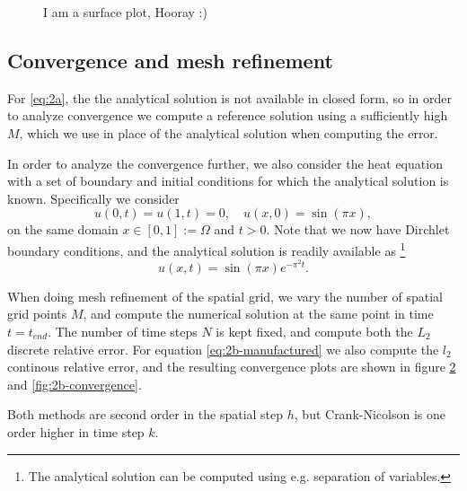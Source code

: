 \begin{figure}[ht]
    \centering
    
    \caption{I am a surface plot, Hooray :)}
    \label{fig:2a-surface}
\end{figure}

\subsection{Convergence and mesh refinement}
For \eqref{eq:2a}, the the analytical solution is not available in closed form, 
so in order to analyze convergence we compute a reference solution using a sufficiently high $M$, 
which we use in place of the analytical solution when computing the error. 

In order to analyze the convergence further, 
we also consider the heat equation with a set of boundary and initial conditions for which the analytical solution is known. 
Specifically we consider 
\begin{equation}
    u(0,t) = u(1,t) = 0, \quad u(x,0) = \sin(\pi x), 
    \label{eq:2b-manufactured}
\end{equation}
on the same domain $x \in [0,1] := \Omega$ and $t > 0$. 
Note that we now have Dirchlet boundary conditions, 
and the analytical solution is readily available as 
\footnote{The analytical solution can be computed using e.g. separation of variables.}
\begin{equation}
    u(x,t) = \sin(\pi x)  e^{- \pi^2 t}.
\end{equation}

When doing mesh refinement of the spatial grid, 
we vary the number of spatial grid points $M$, 
and compute the numerical solution at the same point in time $t=t_{end}$. 
The number of time steps $N$ is kept fixed, 
and compute both the $L_2$ discrete relative error. 
For equation \eqref{eq:2b-manufactured} we also compute the $l_2$ continous relative error, 
and the resulting convergence plots are shown in figure \ref{fig:2a-convergence} and \ref{fig:2b-convergence}. 

Both methods are second order in the spatial step $h$, 
but Crank-Nicolson is one order higher in time step $k$. 

\begin{figure}[ht]
    \centering
    
    \label{fig:2a-convergence}
\end{figure}

